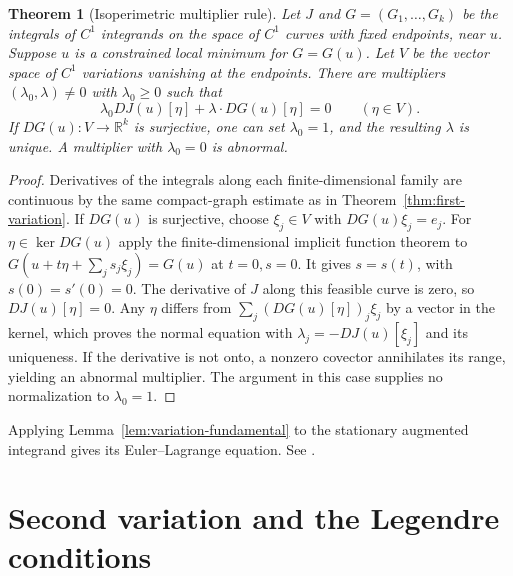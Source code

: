 \documentclass[11pt,oneside,openany]{book}
\theoremstyle{plain}
\newtheorem{theorem}{Theorem}[chapter]
\theoremstyle{definition}
\theoremstyle{remark}
\begin{document}
\begin{theorem}[Isoperimetric multiplier rule]
\label{thm:v07-04-01}
Let \(J\) and \(G=(G_1,\ldots,G_k)\) be the integrals of \(C^1\)
integrands on the space of \(C^1\) curves with fixed endpoints,
near \(u\). Suppose \(u\) is a constrained local minimum for
\(G=G(u)\). Let \(V\) be the vector space of \(C^1\) variations
vanishing at the endpoints. There are multipliers
\((\lambda_0,\lambda)\ne0\) with \(\lambda_0\ge0\) such that
\[
 \lambda_0 DJ(u)[\eta]+\lambda\cdot DG(u)[\eta]=0
 \qquad(\eta\in V).
\]
If \(DG(u):V\to\mathbb R^k\) is surjective, one can set
\(\lambda_0=1\), and the resulting \(\lambda\) is unique.
A multiplier with \(\lambda_0=0\) is abnormal.
\end{theorem}
\begin{proof}
Derivatives of the integrals along each finite-dimensional family
are continuous by the same compact-graph estimate as in
Theorem~\ref{thm:first-variation}. If \(DG(u)\) is surjective,
choose \(\xi_j\in V\) with \(DG(u)\xi_j=e_j\).
For \(\eta\in\ker DG(u)\) apply the finite-dimensional implicit
function theorem to
\(G(u+t\eta+\sum_j s_j\xi_j)=G(u)\) at \(t=0,s=0\).
It gives \(s=s(t)\), with \(s(0)=s'(0)=0\).
The derivative of \(J\) along this feasible curve is zero,
so \(DJ(u)[\eta]=0\). Any \(\eta\) differs from
\(\sum_j(DG(u)[\eta])_j\xi_j\) by a vector in the kernel,
which proves the normal equation with
\(\lambda_j=-DJ(u)[\xi_j]\) and its uniqueness.
If the derivative is not onto, a nonzero covector annihilates
its range, yielding an abnormal multiplier. The argument in
this case supplies no normalization to \(\lambda_0=1\).
\end{proof}

Applying Lemma~\ref{lem:variation-fundamental} to the stationary
augmented integrand gives its Euler--Lagrange equation. See \cite[Section 2.5.1]{Liberzon}.

\section{Second variation and the Legendre conditions}
\label{v07-05}
\end{document}
